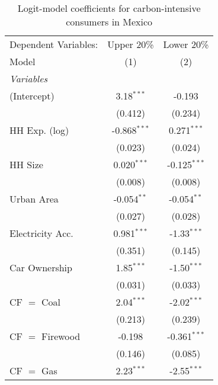 
\begin{table}[htbp!]
   \centering
   \small
   \begin{adjustbox}{width = 1\textwidth, max height = 0.95\textheight, center}
      \begin{threeparttable}[b]
         \caption{\label{tab:Logit_1_MEX} Logit-model coefficients for carbon-intensive consumers in Mexico}
         \begin{tabular}{lcc}
            \tabularnewline \midrule \midrule
            Dependent Variables: & Upper 20\%     & Lower 20\%\\   
            Model                & (1)            & (2)\\  
            \midrule
            \emph{Variables}\\
            (Intercept)          & 3.18$^{***}$   & -0.193\\   
                                 & (0.412)        & (0.234)\\   
            HH Exp. (log)        & -0.868$^{***}$ & 0.271$^{***}$\\   
                                 & (0.023)        & (0.024)\\   
            HH Size              & 0.020$^{***}$  & -0.125$^{***}$\\   
                                 & (0.008)        & (0.008)\\   
            Urban Area           & -0.054$^{**}$  & -0.054$^{**}$\\   
                                 & (0.027)        & (0.028)\\   
            Electricity Acc.     & 0.981$^{***}$  & -1.33$^{***}$\\   
                                 & (0.351)        & (0.145)\\   
            Car Ownership        & 1.85$^{***}$   & -1.50$^{***}$\\   
                                 & (0.031)        & (0.033)\\   
            CF $=$ Coal          & 2.04$^{***}$   & -2.02$^{***}$\\   
                                 & (0.213)        & (0.239)\\   
            CF $=$ Firewood      & -0.198         & -0.361$^{***}$\\   
                                 & (0.146)        & (0.085)\\   
            CF $=$ Gas           & 2.23$^{***}$   & -2.55$^{***}$\\   

\end{tabular}
\end{threeparttable}
\end{adjustbox}
\end{table}
